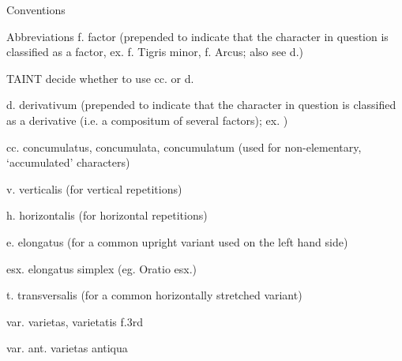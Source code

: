 {\mktsHTwo{}Conventions\mktsHTwoBeg}%

{\mktsHTwo{}Abbreviations\mktsHTwoBeg}%
f. factor (prepended to indicate that the character in question is classified as a factor,
  ex. {} {\mktsStyleItalic{}f. Tigris minor\/}, {} {\mktsStyleItalic{}f. Arcus\/}; also see {\mktsStyleItalic{}d.\/})


\begin{mktsEnvBlockquote}
{\mktsHThree{}TAINT decide whether to use {\mktsStyleItalic{}cc.\/} or {\mktsStyleItalic{}d.\/}\mktsHThreeBeg}%

\end{mktsEnvBlockquote}

d. derivativum (prepended to indicate that the character in question is classified as
  a derivative (i.e. a compositum of several factors); ex. )


cc. concumulatus, concumulata, concumulatum (used for non-elementary, ‘accumulated’ characters)


v. verticalis (for vertical repetitions)


h. horizontalis (for horizontal repetitions)


e. elongatus (for a common upright variant used on the left hand side)


esx. elongatus simplex (eg. {} Oratio esx.)


t. transversalis (for a common horizontally stretched variant)


var. varietas, varietatis {\mktsStyleItalic{}f.3rd\/}


var. {\mktsStyleItalic{}ant.\/} varietas antiqua



